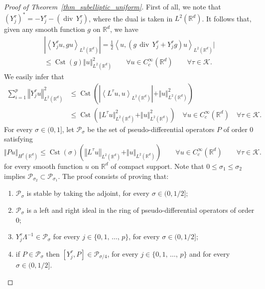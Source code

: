 \documentclass[AHL,Unicode,published]{cedram}
\newcommand*\R{\mathbb{R}}
\newcommand{\calK}{\mathcal{K}}
\newcommand{\calP}{\mathcal{P}}
\DeclareMathOperator{\Cst}{Cst}
\DeclareMathOperator{\divl}{div}
\renewcommand{\leq}{\leqslant}
\let\oldforall\forall
\renewcommand*{\forall}{\mathrel{\oldforall}}
\begin{document}
\begin{proof}[Proof of Theorem~\ref{thm_subelliptic_uniform}]
First of all, we note that $(Y_j^\tau)^*=-Y_j^\tau-(\divl\, Y_j^\tau)$, where the dual is taken in $L^2(\R^d)$. It follows that, given any smooth function $g$ on $\R^d$, we have
\begin{multline*}
\left\vert\left\langle Y_j^\tau u,gu\right\rangle_{L^2\left(\R^d\right)}\right\vert = \frac{1}{2} \left\langle u, \left(g\,\divl\, Y_j^\tau+Y_j^\tau g\right)u\right\rangle_{L^2\left(\R^d\right)}\bigg\vert\\
\leq \Cst(g) \Vert u\Vert_{L^2\left(\R^d\right)}^2 
\qquad\forall u\in C_c^\infty\left(\R^d\right)\qquad \forall \tau\in\calK.
\end{multline*}
We easily infer that
\begin{align*}
\sum_{i=1}^p \left\Vert Y_j^\tau u\right\Vert_{L^2\left(\R^d\right)}^2 &\leq \Cst\left(\left\vert\left\langle L^\tau u,u\right\rangle_{L^2\left(\R^d\right)}\right\vert+\Vert u\Vert_{L^2\left(\R^d\right)}^2\right) \\
&\leq \Cst \left(\Vert L^\tau u\Vert_{L^2\left(\R^d\right)}^2+\Vert u\Vert_{L^2\left(\R^d\right)}^2 \right)
\quad \forall u\in C_c^\infty\left(\R^d\right) \quad \forall \tau\in\calK.
\end{align*}
For every $\sigma\in(0,1]$, let $\calP_\sigma$ be the set of pseudo-differential operators $P$ of order $0$ satisfying
\[
\Vert Pu\Vert_{H^\sigma\left(\R^d\right)} \leq \Cst(\sigma) \left(\left\Vert L^\tau u\right\Vert_{L^2\left(\R^d\right)} + \Vert u \Vert_{L^2\left(\R^d\right)} \right)
\qquad \forall u\in C_c^\infty\left(\R^d\right) \qquad \forall \tau\in\calK.
\]
for every smooth function $u$ on $\R^d$ of compact support. Note that $0\leq \sigma_1\leq \sigma_2$ implies $\calP_{\sigma_2}\subset\calP_{\sigma_1}$. The proof consists of proving that:
\begin{enumerate}
\item $\calP_\sigma$ is stable by taking the adjoint, for every $\sigma\in(0,1/2]$;
\item $\calP_\sigma$ is a left and right ideal in the ring of pseudo-differential operators of order $0$;
\item $Y_j^\tau\Lambda^{-1}\in\calP_\sigma$ for every $j\in\{0,1,\,\ldots,\,p\}$, for every $\sigma\in(0,1/2]$;
\item if $P\in \calP_\sigma$ then $[Y_j^\tau,P]\in \calP_{\sigma/4}$, for every $j\in\{0,1,\,\ldots,\,p\}$ and for every $\sigma\in(0,1/2]$.
\end{enumerate}

\end{proof}
\end{document}
